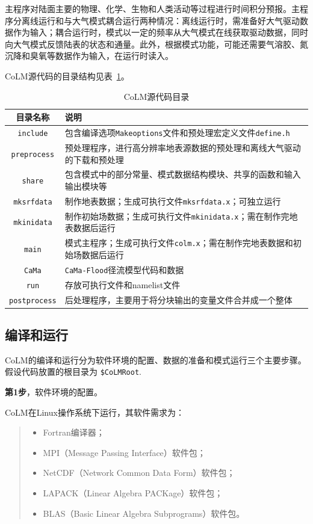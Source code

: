 \documentclass[a4paper,12pt,twoside]{article}
\begin{document}
主程序对陆面主要的物理、化学、生物和人类活动等过程进行时间积分预报。主程序分离线运行和与大气模式耦合运行两种情况：离线运行时，需准备好大气驱动数据作为输入；耦合运行时，模式以一定的频率从大气模式在线获取驱动数据，同时向大气模式反馈陆表的状态和通量。此外，根据模式功能，可能还需要气溶胶、氮沉降和臭氧等数据作为输入，在运行时读入。

CoLM源代码的目录结构见表~\ref{subdirectories}。
\begin{table}[!htbp]\small
\caption{CoLM源代码目录} \label{subdirectories}
\centering \renewcommand{\arraystretch}{1.5}
\begin{tabular}{cp{}}
\toprule
\textbf{目录名称} & \textbf{说明} \\
\midrule
\texttt{include} & 包含编译选项\texttt{Makeoptions}文件和预处理宏定义文件\texttt{define.h} \\
\texttt{preprocess} & 预处理程序，进行高分辨率地表源数据的预处理和离线大气驱动的下载和预处理 \\
\texttt{share} & 包含模式中的部分常量、模式数据结构模块、共享的函数和输入输出模块等 \\
\texttt{mksrfdata} & 制作地表数据；生成可执行文件\texttt{mksrfdata.x}；可独立运行 \\
\texttt{mkinidata} & 制作初始场数据；生成可执行文件\texttt{mkinidata.x}；需在制作完地表数据后运行\\
\texttt{main} & 模式主程序；生成可执行文件\texttt{colm.x}；需在制作完地表数据和初始场数据后运行\\
\texttt{CaMa} & \texttt{CaMa-Flood}径流模型代码和数据 \\
\texttt{run} & 存放可执行文件和namelist文件 \\
\texttt{postprocess} & 后处理程序，主要用于将分块输出的变量文件合并成一个整体 \\
\bottomrule
\end{tabular}
\end{table}

\subsection{编译和运行}\label{comprun}

CoLM的编译和运行分为软件环境的配置、数据的准备和模式运行三个主要步骤。假设代码放置的根目录为 \texttt{\$CoLMRoot}.

\textbf{第1步}，软件环境的配置。

CoLM在Linux操作系统下运行，其软件需求为：
\begin{quote}
\begin{itemize}
\setlength{\itemsep}{0pt}
\setlength{\parsep}{0pt}
\setlength{\parskip}{0pt}
    \item Fortran编译器；
    \item MPI（Message Passing Interface）软件包；
    \item NetCDF（Network Common Data Form）软件包；
    \item LAPACK（Linear Algebra PACKage）软件包；
    \item BLAS（Basic Linear Algebra Subprograms）软件包。
\end{itemize}
\end{quote}
\end{document}
